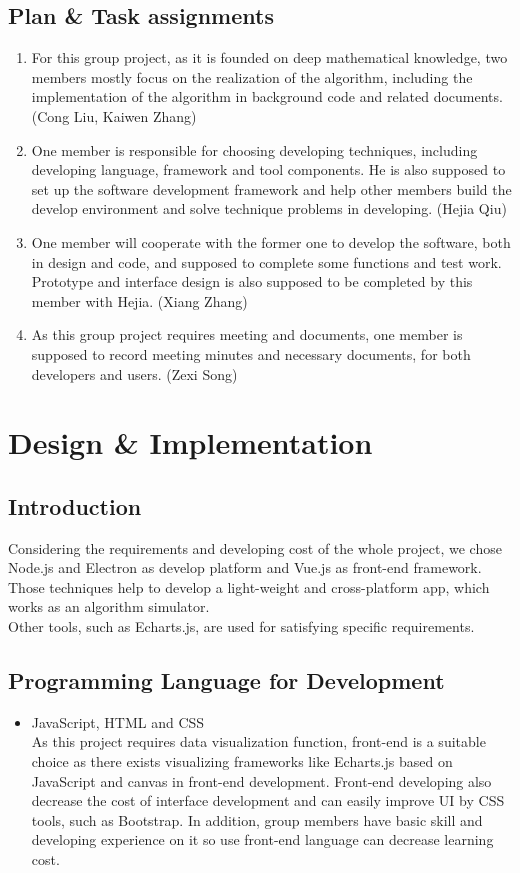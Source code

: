 \subsection{Plan \& Task assignments}
\begin{enumerate}
  \item For this group project, as it is founded on deep mathematical knowledge, two members mostly focus on the realization of the algorithm, including the implementation of the algorithm in background code and related documents. (Cong Liu, Kaiwen Zhang)
  \item One member is responsible for choosing developing techniques, including developing language, framework and tool components. He is also supposed to set up the software development framework and help other members build the develop environment and solve technique problems in developing. (Hejia Qiu)
  \item One member will cooperate with the former one to develop the software, both in design and code, and supposed to complete some functions and test work. Prototype and interface design is also supposed to be completed by this member with Hejia. (Xiang Zhang)
  \item As this group project requires meeting and documents, one member is supposed to record meeting minutes and necessary documents, for both developers and users. (Zexi Song)
\end{enumerate}

\section{Design \& Implementation}
\subsection{Introduction}
    Considering the requirements and developing cost of the whole project, we chose Node.js and Electron as develop platform and Vue.js as front-end framework. Those techniques help to develop a light-weight and cross-platform app, which works as an algorithm simulator.\\
    Other tools, such as Echarts.js, are used for satisfying specific requirements.
\subsection{Programming Language for Development}
\begin{itemize}
    \item JavaScript, HTML and CSS\\
    As this project requires data visualization function, front-end is a suitable choice as there exists visualizing frameworks like Echarts.js based on JavaScript and canvas in front-end development.
    Front-end developing also decrease the cost of interface development and can easily improve UI by CSS tools, such as Bootstrap. In addition, group members have basic skill and developing experience on it so use front-end language can decrease learning cost. 
\end{itemize}
